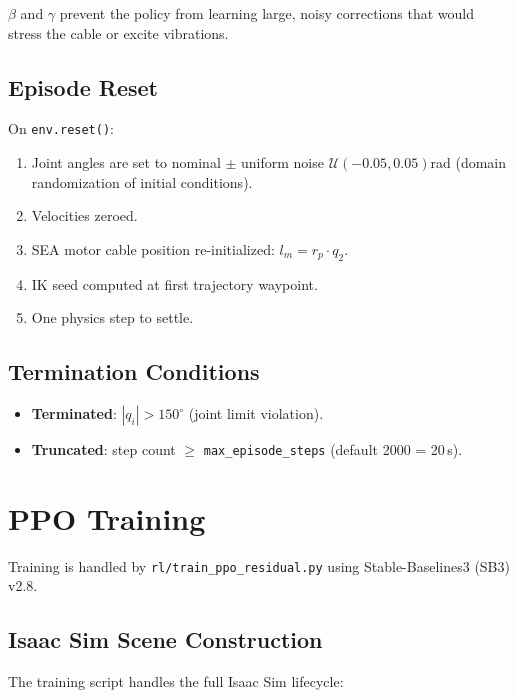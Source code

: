 \documentclass[11pt, a4paper]{article}
\begin{document}
$\beta$ and $\gamma$ prevent the policy from learning large, noisy
corrections that would stress the cable or excite vibrations.

\subsection{Episode Reset}

On \texttt{env.reset()}:
\begin{enumerate}[nosep]
  \item Joint angles are set to nominal $\pm$ uniform noise $\mathcal{U}(-0.05, 0.05)$\;rad
        (domain randomization of initial conditions).
  \item Velocities zeroed.
  \item SEA motor cable position re-initialized: $l_m = r_p \cdot q_2$.
  \item IK seed computed at first trajectory waypoint.
  \item One physics step to settle.
\end{enumerate}

\subsection{Termination Conditions}

\begin{itemize}[nosep]
  \item \textbf{Terminated}: $|q_i| > 150^\circ$ (joint limit violation).
  \item \textbf{Truncated}: step count $\geq$ \texttt{max\_episode\_steps}
        (default 2000 = 20\,s).
\end{itemize}


\section{PPO Training}
\label{sec:train}

Training is handled by \texttt{rl/train\_ppo\_residual.py} using
Stable-Baselines3 (SB3) v2.8.

\subsection{Isaac Sim Scene Construction}

The training script handles the full Isaac Sim lifecycle:
\end{document}
